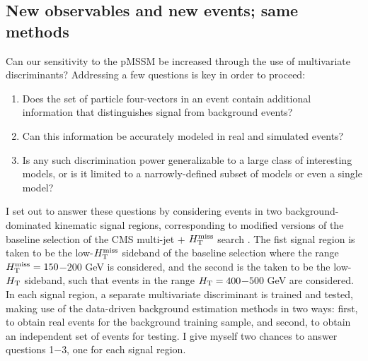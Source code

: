 \subsection{New observables and new events; same methods}
Can our sensitivity to the pMSSM be increased through the use of multivariate discriminants? Addressing a few questions is key in order to proceed: 
\begin{enumerate}
\item Does the set of particle four-vectors in an event contain additional information that distinguishes signal from background events?
\item Can this information be accurately modeled in real and simulated events?
\item Is any such discrimination power generalizable to a large class of interesting models, or is it limited to a narrowly-defined subset of models or even a single model?
\end{enumerate}
I set out to answer these questions by considering events in two background-dominated kinematic signal regions, corresponding to modified versions of the baseline selection of the CMS multi-jet $+$ $H_{\text{T}}^{\rm miss}$ search \cite{Khachatryan:2016kdk}. The fist signal region is taken to be the low-$H_{\text{T}}^{\rm miss}$ sideband of the \cite{Khachatryan:2016kdk} baseline selection where the range $H_{\text{T}}^{\rm miss}=150$$-$$200$ GeV is considered, and the second is the taken to be the low-$H_{\rm T}$  sideband, such that events in the range $H_{\rm T}=400$$-$$500$ GeV are considered. In each signal region, a separate multivariate discriminant is trained and tested, making use of the data-driven background estimation methods in two ways: first, to obtain real events for the background training sample, and second, to obtain an independent set of events for testing. I give myself two chances to answer questions 1$-$3, one for each signal region.


